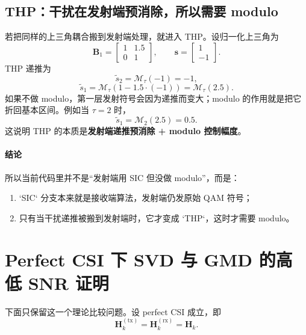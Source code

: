 \documentclass[11pt]{ctexart}
\begin{document}
\subsection{THP：干扰在发射端预消除，所以需要 modulo}
若把同样的上三角耦合搬到发射端处理，就进入 THP。设归一化上三角为
\begin{equation}
    \bm{B}_1
    =
    \begin{bmatrix}
        1 & 1.5\\
        0 & 1
    \end{bmatrix},
    \qquad
    \bm{s}
    =
    \begin{bmatrix}
        1\\
        -1
    \end{bmatrix}.
\end{equation}
THP 递推为
\begin{equation}
    \widetilde{s}_2 = \mathcal{M}_{\tau}(-1) = -1,
\end{equation}
\begin{equation}
    \widetilde{s}_1
    =
    \mathcal{M}_{\tau}\!\left(
        1 - 1.5\cdot(-1)
    \right)
    =
    \mathcal{M}_{\tau}(2.5).
\end{equation}
如果不做 modulo，第一层发射符号会因为递推而变大；modulo 的作用就是把它折回基本区间。例如当 $\tau=2$ 时，
\begin{equation}
    \widetilde{s}_1
    =
    \mathcal{M}_{2}(2.5)
    =
    0.5.
\end{equation}
这说明 THP 的本质是\textbf{发射端递推预消除 + modulo 控制幅度}。

\paragraph{结论}
所以当前代码里并不是“发射端用 SIC 但没做 modulo”，而是：
\begin{enumerate}
    \item `SIC` 分支本来就是接收端算法，发射端仍发原始 QAM 符号；
    \item 只有当干扰递推被搬到发射端时，它才变成 `THP`，这时才需要 modulo。
\end{enumerate}

\section{Perfect CSI 下 SVD 与 GMD 的高低 SNR 证明}
下面只保留这一个理论比较问题。设 perfect CSI 成立，即
\begin{equation}
    \bm{H}_k^{(\mathrm{tx})}
    =
    \bm{H}_k^{(\mathrm{rx})}
    =
    \bm{H}_k.
\end{equation}
\end{document}
